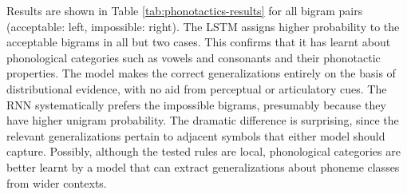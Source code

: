 Results are shown in Table \ref{tab:phonotactics-results} for all
bigram pairs (acceptable: left, impossible: right).  The LSTM assigns
higher probability to the acceptable bigrams in all but two cases.
This confirms that it has learnt about phonological categories such as
vowels and consonants and their phonotactic properties.  The
model makes the correct generalizations entirely on the basis of
distributional evidence, with no aid from perceptual or articulatory
cues. The RNN systematically prefers the impossible
bigrams, presumably because they have higher unigram probability. The
dramatic difference is surprising, since the relevant generalizations
pertain to adjacent symbols that either model should
capture. Possibly, although the tested rules are local, phonological
categories are better learnt by a model that can extract
generalizations about phoneme classes from wider contexts.

